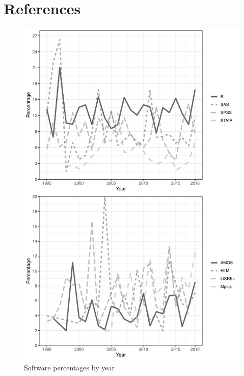 \documentclass[english,,man]{apa6}
\begin{document}
\hypertarget{references}{%
\section{References}\label{references}}

\setlength{\parindent}{-0.5in}
\setlength{\leftskip}{0.5in}

\begin{figure}
\centering
\includegraphics{software_files/figure-latex/software-year-at1-1.pdf}
\caption{\label{fig:software-year-at1}Software percentages by year}
\end{figure}
\end{document}
